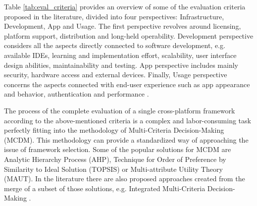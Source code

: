 Table \ref{tab:eval_criteria} provides an overview of some of the evaluation criteria proposed in the literature, divided into four perspectives: Infrastructure, Development, App and Usage. The first perspective revolves around licensing, platform support, distribution and long-held operability. Development perspective considers all the aspects directly connected to software development, e.g. available IDEs, learning and implementation effort, scalability, user interface design abilities, maintainability and testing. App perspective includes mainly security, hardware access and external devices. Finally, Usage perspective concerns the aspects connected with end-user experience such as app appearance and behavior, authentication and performance \cite{eval_rn_flutter,rieger_eval_cp}.

The process of the complete evaluation of a single cross-platform framework according to the above-mentioned criteria is a complex and labor-consuming task perfectly fitting into the methodology of Multi-Criteria Decision-Making (MCDM). This methodology can provide a standardized way of approaching the issue of framework selection. Some of the popular solutions for MCDM are Analytic Hierarchy Process (AHP), Technique for Order of Preference by Similarity to Ideal Solution (TOPSIS) or Multi-attribute Utility Theory (MAUT). In the literature there are also proposed approaches created from the merge of a subset of those solutions, e.g. Integrated Multi-Criteria Decision-Making \cite{lachgar_mcdm_cp}.
